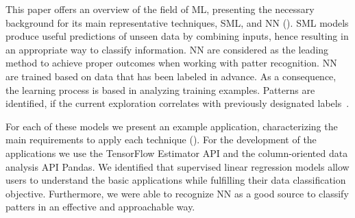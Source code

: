 This paper offers an overview of the field of \ac{ML}, presenting the necessary background for its 
main representative techniques, \ac{SML}, and \ac{NN} (). 
\ac{SML} models produce useful predictions of unseen data by combining inputs, hence resulting in 
an appropriate way to classify information. \ac{NN} are considered as the leading method to achieve 
proper outcomes when working with patter recognition. \ac{NN} are trained based on data that has 
been labeled in advance. As a consequence, the learning process is based in analyzing training 
examples. Patterns are identified, if the current exploration  correlates with previously designated 
labels~\cite{mit17}. 

For each of these models we present an example application, characterizing the main 
requirements to apply each technique (). For the development of the applications 
we use the TensorFlow Estimator API and the column-oriented data analysis API Pandas.
We identified that supervised linear regression models allow users to understand the basic 
applications while fulfilling their data classification objective. Furthermore, we were able to recognize 
\ac{NN} as a good source to classify patters in an effective and approachable way. 


\endinput

Machine Learning through supervised linear regression models allows users to understand the basic applications while fulfilling their data classification objective. Furthermore, we were able to recognize Neural Networks as a good source to classify patters in an effective and approachable way. Moreover, due to available resources such as high level TensorFlow Estimator API and the column-oriented data analysis API Pandas learning doesn’t require long before the user can start working on Machine Learning projects. 


